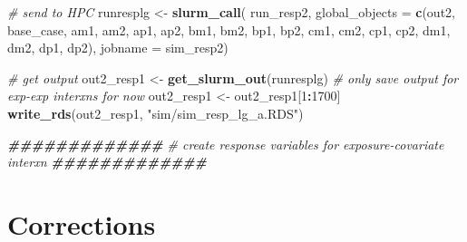 \documentclass[12pt, twoside]{amherstthesis}
\newenvironment{Shaded}{\begin{snugshade}}{\end{snugshade}}
\newcommand{\AttributeTok}[1]{\textcolor[rgb]{0.13,0.29,0.53}{#1}}
\newcommand{\CommentTok}[1]{\textcolor[rgb]{0.56,0.35,0.01}{\textit{#1}}}
\newcommand{\DecValTok}[1]{\textcolor[rgb]{0.00,0.00,0.81}{#1}}
\newcommand{\DocumentationTok}[1]{\textcolor[rgb]{0.56,0.35,0.01}{\textbf{\textit{#1}}}}
\newcommand{\FunctionTok}[1]{\textcolor[rgb]{0.13,0.29,0.53}{\textbf{#1}}}
\newcommand{\NormalTok}[1]{#1}
\newcommand{\OtherTok}[1]{\textcolor[rgb]{0.56,0.35,0.01}{#1}}
\newcommand{\SpecialCharTok}[1]{\textcolor[rgb]{0.81,0.36,0.00}{\textbf{#1}}}
\newcommand{\StringTok}[1]{\textcolor[rgb]{0.31,0.60,0.02}{#1}}
\begin{document}
\begin{Shaded}
\begin{Highlighting}[]
\CommentTok{\# send to HPC}
\NormalTok{runresplg }\OtherTok{\textless{}{-}} \FunctionTok{slurm\_call}\NormalTok{(}
\NormalTok{  run\_resp2, }
  \AttributeTok{global\_objects =} \FunctionTok{c}\NormalTok{(}\StringTok{\textquotesingle{}out2\textquotesingle{}}\NormalTok{, }\StringTok{\textquotesingle{}base\_case\textquotesingle{}}\NormalTok{, }
                     \StringTok{\textquotesingle{}am1\textquotesingle{}}\NormalTok{, }\StringTok{\textquotesingle{}am2\textquotesingle{}}\NormalTok{, }\StringTok{\textquotesingle{}ap1\textquotesingle{}}\NormalTok{, }\StringTok{\textquotesingle{}ap2\textquotesingle{}}\NormalTok{, }
                     \StringTok{\textquotesingle{}bm1\textquotesingle{}}\NormalTok{, }\StringTok{\textquotesingle{}bm2\textquotesingle{}}\NormalTok{, }\StringTok{\textquotesingle{}bp1\textquotesingle{}}\NormalTok{, }\StringTok{\textquotesingle{}bp2\textquotesingle{}}\NormalTok{, }
                     \StringTok{\textquotesingle{}cm1\textquotesingle{}}\NormalTok{, }\StringTok{\textquotesingle{}cm2\textquotesingle{}}\NormalTok{, }\StringTok{\textquotesingle{}cp1\textquotesingle{}}\NormalTok{, }\StringTok{\textquotesingle{}cp2\textquotesingle{}}\NormalTok{, }
                     \StringTok{\textquotesingle{}dm1\textquotesingle{}}\NormalTok{, }\StringTok{\textquotesingle{}dm2\textquotesingle{}}\NormalTok{, }\StringTok{\textquotesingle{}dp1\textquotesingle{}}\NormalTok{, }\StringTok{\textquotesingle{}dp2\textquotesingle{}}\NormalTok{),}
  \AttributeTok{jobname =} \StringTok{\textquotesingle{}sim\_resp2\textquotesingle{}}\NormalTok{)}

\CommentTok{\# get output}
\NormalTok{out2\_resp1 }\OtherTok{\textless{}{-}} \FunctionTok{get\_slurm\_out}\NormalTok{(runresplg)}
\CommentTok{\# only save output for exp{-}exp interxns for now}
\NormalTok{out2\_resp1 }\OtherTok{\textless{}{-}}\NormalTok{ out2\_resp1[}\DecValTok{1}\SpecialCharTok{:}\DecValTok{1700}\NormalTok{]}
\FunctionTok{write\_rds}\NormalTok{(out2\_resp1, }\StringTok{"sim/sim\_resp\_lg\_a.RDS"}\NormalTok{)}
\end{Highlighting}
\end{Shaded}
\begin{Shaded}
\begin{Highlighting}[]
\DocumentationTok{\#\#\#\#\#\#\#\#\#\#\#\#\#}
\CommentTok{\# create response variables for exposure{-}covariate interxn}
\DocumentationTok{\#\#\#\#\#\#\#\#\#\#\#\#\#}
\end{Highlighting}
\end{Shaded}
\hypertarget{corrections}{%
\chapter*{Corrections}\label{corrections}}
\end{document}
